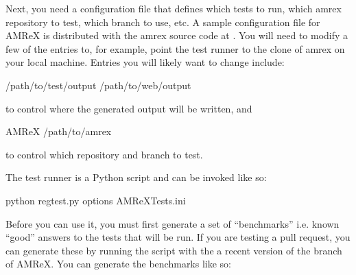 \documentclass[letterpaper,10pt,english]{sphinxmanual}
\begin{document}
\sphinxAtStartPar
Next, you need a configuration file that defines which tests to run, which amrex repository to test,
which branch to use, etc. A sample configuration file for AMReX is distributed with the amrex source
code at . You will need to modify a few of the entries
to, for example, point the test runner to the clone of amrex on your local machine. Entries you will
likely want to change include:

\begin{sphinxVerbatim}[commandchars=\\\{\}]
  /path/to/test/output 
   /path/to/web/output  
\end{sphinxVerbatim}

\sphinxAtStartPar
to control where the generated output will be written, and

\begin{sphinxVerbatim}[commandchars=\\\{\}]
\PYG{o}{[}AMReX\PYG{o}{]}
  /path/to/amrex  
  
\end{sphinxVerbatim}

\sphinxAtStartPar
to control which repository and branch to test.

\sphinxAtStartPar
The test runner is a Python script and can be invoked like so:

\begin{sphinxVerbatim}[commandchars=\\\{\}]
python regtest.py \PYGZlt{}options\PYGZgt{} AMReX\PYGZhy{}Tests.ini
\end{sphinxVerbatim}

\sphinxAtStartPar
Before you can use it, you must first generate a set of “benchmarks” \sphinxhyphen{} i.e. known “good” answers to the
tests that will be run. If you are testing a pull request, you can generate these by running the script
with the a recent version of the  branch of AMReX. You can generate the benchmarks like so:
\end{document}
